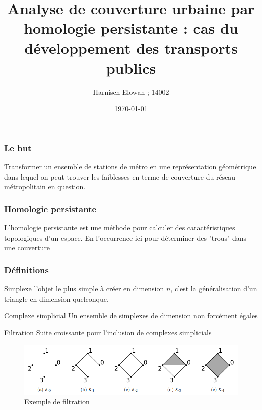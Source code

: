 \documentclass{beamer}
\begin{document}
\title{Analyse de couverture urbaine par homologie persistante : cas du 
    développement des transports publics}
\author{Harnisch Elowan ; 14002}
\date{\today}

\maketitle

\begin{frame}
    \frametitle{Le but}
    Transformer un ensemble de stations de métro en une représentation géométrique
    dans lequel on peut trouver les faiblesses en terme de couverture du réseau 
    métropolitain en question. 
    
\end{frame}

\begin{frame}
    \frametitle{Homologie persistante}
    L'homologie persistante est une méthode pour calculer des caractéristiques
    topologiques d'un espace. En l'occurrence ici pour déterminer des "trous" dans
    une couverture
    
\end{frame}

\begin{frame}
    \frametitle{Définitions}
    \begin{block}{Simplexe}
        l'objet le plus simple à créer en dimension $n$, c'est la généralisation
        d'un triangle en dimension quelconque.
    \end{block}

    \begin{block}{Complexe simplicial}
        Un ensemble de simplexes de dimension non forcément égales
    \end{block}

    \begin{block}{Filtration}
        Suite croissante pour l'inclusion de complexes simplicials
    \end{block}

    \begin{figure}
        \includegraphics[width=\textwidth]{filtration}
        \centering
        \caption{Exemple de filtration}
    \end{figure}
    
\end{frame}
\end{document}
